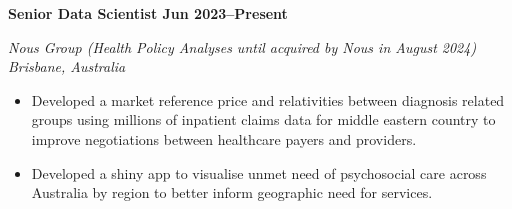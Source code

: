 \textbf{Senior Data Scientist \hfill Jun 2023--Present}\par
\textit{Nous Group (Health Policy Analyses until acquired by Nous in August 2024) \hfill Brisbane, Australia}\par
\begin{itemize}
	\item Developed a market reference price and relativities between diagnosis related groups using millions of inpatient claims data for middle eastern country to improve negotiations between healthcare payers and providers.
	\item Developed a shiny app to visualise unmet need of psychosocial care across Australia by region to better inform geographic need for services.
\end{itemize}\par
